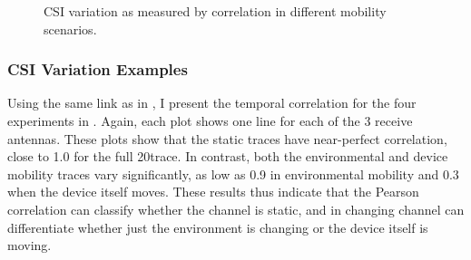 \begin{figure}[htb]
	\hspace{0.06\textwidth}%
	\caption[CSI variation as measured by correlation in different mobility scenarios]{\label{fig:mobility_csi}CSI variation as measured by correlation in different mobility scenarios.}
\end{figure}

\subsubsection{CSI Variation Examples}
Using the same link as in , I present the temporal correlation for the four experiments in . Again, each plot shows one line for each of the 3 receive antennas. These plots show that the static traces have near-perfect correlation, close to 1.0 for the full 20\s trace.  In contrast, both the environmental and device mobility traces vary significantly, as low as 0.9 in environmental mobility and 0.3 when the device itself moves. These results thus indicate that the Pearson correlation can classify whether the channel is static, and in changing channel can differentiate whether just the environment is changing or the device itself is moving.

